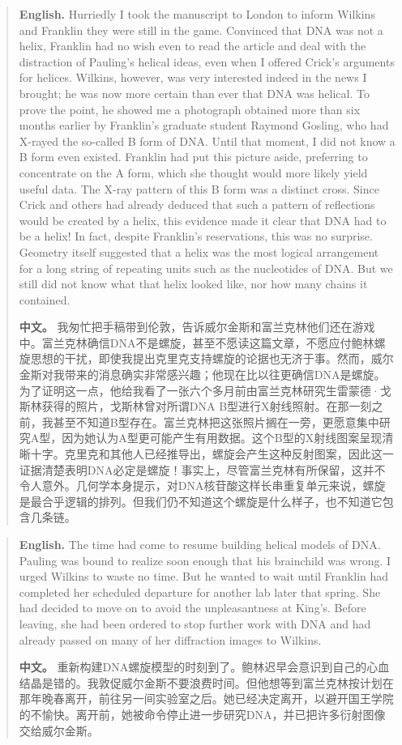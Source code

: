 \begin{quote}
\noindent\textbf{English.} Hurriedly I took the manuscript to London to inform Wilkins and Franklin they were still in the game. Convinced that DNA was not a helix, Franklin had no wish even to read the article and deal with the distraction of Pauling's helical ideas, even when I offered Crick's arguments for helices. Wilkins, however, was very interested indeed in the news I brought; he was now more certain than ever that DNA was helical. To prove the point, he showed me a photograph obtained more than six months earlier by Franklin's graduate student Raymond Gosling, who had X-rayed the so-called B form of DNA. Until that moment, I did not know a B form even existed. Franklin had put this picture aside, preferring to concentrate on the A form, which she thought would more likely yield useful data. The X-ray pattern of this B form was a distinct cross. Since Crick and others had already deduced that such a pattern of reflections would be created by a helix, this evidence made it clear that DNA had to be a helix! In fact, despite Franklin's reservations, this was no surprise. Geometry itself suggested that a helix was the most logical arrangement for a long string of repeating units such as the nucleotides of DNA. But we still did not know what that helix looked like, nor how many chains it contained.

\smallskip
\noindent\textbf{中文。} 我匆忙把手稿带到伦敦，告诉威尔金斯和富兰克林他们还在游戏中。富兰克林确信DNA不是螺旋，甚至不愿读这篇文章，不愿应付鲍林螺旋思想的干扰，即使我提出克里克支持螺旋的论据也无济于事。然而，威尔金斯对我带来的消息确实非常感兴趣；他现在比以往更确信DNA是螺旋。为了证明这一点，他给我看了一张六个多月前由富兰克林研究生雷蒙德·戈斯林获得的照片，戈斯林曾对所谓DNA B型进行X射线照射。在那一刻之前，我甚至不知道B型存在。富兰克林把这张照片搁在一旁，更愿意集中研究A型，因为她认为A型更可能产生有用数据。这个B型的X射线图案呈现清晰十字。克里克和其他人已经推导出，螺旋会产生这种反射图案，因此这一证据清楚表明DNA必定是螺旋！事实上，尽管富兰克林有所保留，这并不令人意外。几何学本身提示，对DNA核苷酸这样长串重复单元来说，螺旋是最合乎逻辑的排列。但我们仍不知道这个螺旋是什么样子，也不知道它包含几条链。
\end{quote}

\begin{quote}
\noindent\textbf{English.} The time had come to resume building helical models of DNA. Pauling was bound to realize soon enough that his brainchild was wrong. I urged Wilkins to waste no time. But he wanted to wait until Franklin had completed her scheduled departure for another lab later that spring. She had decided to move on to avoid the unpleasantness at King's. Before leaving, she had been ordered to stop further work with DNA and had already passed on many of her diffraction images to Wilkins.

\smallskip
\noindent\textbf{中文。} 重新构建DNA螺旋模型的时刻到了。鲍林迟早会意识到自己的心血结晶是错的。我敦促威尔金斯不要浪费时间。但他想等到富兰克林按计划在那年晚春离开，前往另一间实验室之后。她已经决定离开，以避开国王学院的不愉快。离开前，她被命令停止进一步研究DNA，并已把许多衍射图像交给威尔金斯。
\end{quote}

